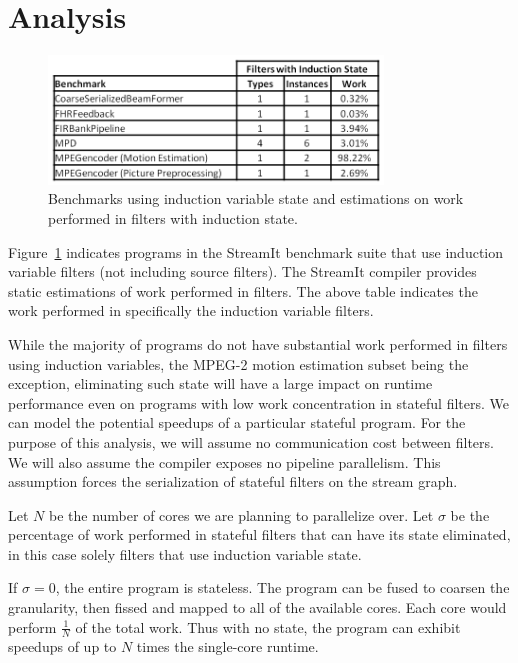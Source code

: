 \section{Analysis}

\begin{figure}[t]
\includegraphics[width=3.5in]{figures/induction-benchmarks.png}
\caption{Benchmarks using induction variable state and estimations on work performed in filters with induction state.\protect\label{fig:benchmarks}}
\end{figure}

Figure~\ref{fig:benchmarks} indicates programs in the StreamIt benchmark suite that use induction variable filters (not including source filters).  The StreamIt compiler provides static estimations of work performed in filters.  The above table indicates the work performed in specifically the induction variable filters.

While the majority of programs do not have substantial work performed in filters using induction variables, the MPEG-2 motion estimation subset being the exception, eliminating such state will have a large impact on runtime performance even on programs with low work concentration in stateful filters.  We can model the potential speedups of a particular stateful program.  For the purpose of this analysis, we will assume no communication cost between filters.  We will also assume the compiler exposes no pipeline parallelism.  This assumption forces the serialization of stateful filters on the stream graph.

Let $N$ be the number of cores we are planning to parallelize over.  Let $\sigma$ be the percentage of work performed in stateful filters that can have its state eliminated, in this case solely filters that use induction variable state.  

If $\sigma = 0$, the entire program is stateless.  The program can be fused to coarsen the granularity, then fissed and mapped to all of the available cores.  Each core would perform $\frac{1}{N}$ of the total work.  Thus with no state, the program can exhibit speedups of up to $N$ times the single-core runtime.

